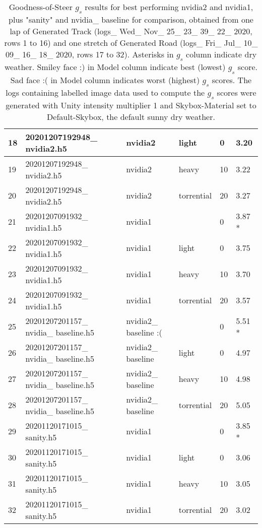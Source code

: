 \begin{table}[]
\begin{center}
\begin{tabular}{l l l l l l}
18 & 20201207192948\_ nvidia2.h5 & nvidia2 & light & 0 & 3.20 \\ \hline
19 & 20201207192948\_ nvidia2.h5 & nvidia2 & heavy & 10 & 3.22 \\ \hline
20 & 20201207192948\_ nvidia2.h5 & nvidia2 & torrential & 20 & 3.27 \\ \hline
21 & 20201207091932\_ nvidia1.h5 & nvidia1 &  & 0 & 3.87 * \\ \hline
22 & 20201207091932\_ nvidia1.h5 & nvidia1 & light & 0 & 3.75 \\ \hline
23 & 20201207091932\_ nvidia1.h5 & nvidia1 & heavy & 10 & 3.70 \\ \hline
24 & 20201207091932\_ nvidia1.h5 & nvidia1 & torrential & 20 & 3.57 \\ \hline
25 & 20201207201157\_ nvidia\_ baseline.h5 & nvidia2\_ baseline :( &  & 0 & 5.51 * \\ \hline
26 & 20201207201157\_ nvidia\_ baseline.h5 & nvidia2\_ baseline & light & 0 & 4.97 \\ \hline
27 & 20201207201157\_ nvidia\_ baseline.h5 & nvidia2\_ baseline & heavy & 10 & 4.98 \\ \hline
28 & 20201207201157\_ nvidia\_ baseline.h5 & nvidia2\_ baseline & torrential & 20 & 5.05 \\ \hline
29 & 20201120171015\_ sanity.h5 & nvidia1 &  & 0 & 3.85 * \\ \hline
30 & 20201120171015\_ sanity.h5 & nvidia1 & light & 0 & 3.06 \\ \hline
31 & 20201120171015\_ sanity.h5 & nvidia1 & heavy & 10 & 3.05 \\ \hline
32 & 20201120171015\_ sanity.h5 & nvidia1 & torrential & 20 & 3.02 \\ \hline
\end{tabular}
\end{center}
\caption{Goodness-of-Steer $g_s$ results for best performing nvidia2 and nvidia1, plus "sanity" and nvidia\_ baseline for comparison, obtained from one lap of Generated Track (logs\_ Wed\_ Nov\_ 25\_ 23\_ 39\_ 22\_ 2020, rows 1 to 16) and one stretch of Generated Road (logs\_ Fri\_ Jul\_ 10\_ 09\_ 16\_ 18\_ 2020, rows 17 to 32). Asterisks in $g_s$ column indicate dry weather. Smiley face :) in Model column indicate best (lowest) $g_s$ score. Sad face :( in Model column indicates worst (highest) $g_s$ scores. The logs containing labelled image data used to compute the $g_s$ scores were generated with Unity intensity multiplier 1 and Skybox-Material set to Default-Skybox, the default sunny dry weather.}
\label{table:goodness-of-steer}
\end{table}

